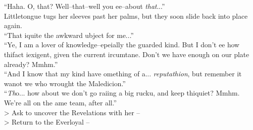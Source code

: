 “Haha. O, that? Well--that--well you \lisp ee--about \emph{that}...”\\

Littletongue tugs her sleeves past her palms, but they soon slide back into place again.\\
“That i\lispx quite the awkward \lisp ubject for me...”\\

“Ye\lisp , I am a lover of knowledge--e\lisp pe\lisp ially the guarded kind. But I don’t \lisp ee how thi\lispx fact i\lispx exigent, given the current \lisp ircum\lisp tan\lisp e\lisp . Don’t we have enough on our plate already? Mmhm.”\\

“And I know that my kind have \lisp omething of a... \emph{reputathion}, but remember it wa\lispx not we who wrought the Maledic\lisp ion.”\\

“\emph{Th}o... how about we don’t go rai\lisp ing a big rucku\lisp, and keep thi\lispx quiet? Mmhm. We’re all on the \lisp ame team, after all.”\\

> Ask to uncover the Revelations with her -- \\
> Return to the Everloyal -- 